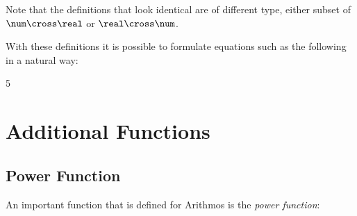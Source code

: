 \documentclass[12pt]{article}
\begin{document}
{}
Note that the definitions that look identical are of different type,
either subset of $\num \cross \real$ or $\real \cross \num$.

With these definitions it is possible to formulate equations such as
the following in a natural way:
\begin{zed}
  5 \azlta \aten {}
\end{zed}

%
\section{Additional Functions}
\label{sec:additional-functions}

\subsection{Power Function}
\label{sec:power-function}
An important function that is defined for Arithmos is the \emph{power
  function}:
%
\end{document}
